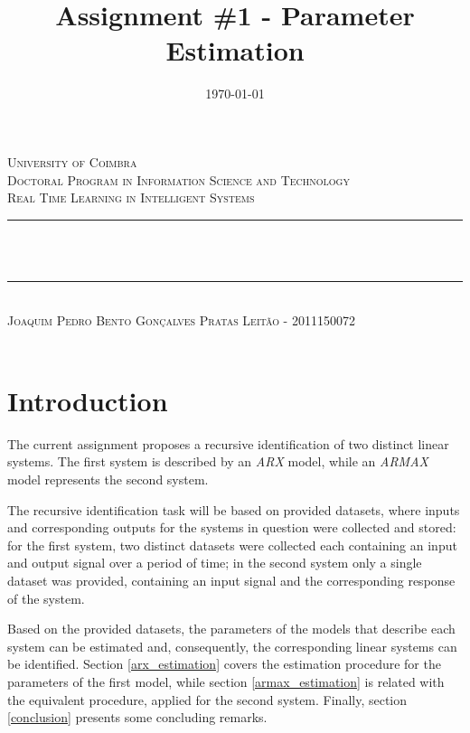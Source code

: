 \documentclass[12pt]{article}
\title{Assignment \#1 - Parameter Estimation}
\date{\today}
\makeatletter
\let\thetitle\@title
\let\thedate\@date
\makeatother
\begin{document}

\begin{titlepage}
	\centering
    \textsc{\LARGE University of Coimbra}\\[1.0 cm]
	\textsc{\large Doctoral Program in Information Science and Technology}\\[0.5 cm]
    \textsc{\large Real Time Learning in Intelligent Systems}\\[5 cm]
	\rule{\linewidth}{0.2 mm} \\[0.4 cm]
	{ \LARGE \bfseries \thetitle}\\ [0.2 cm]
    \rule{\linewidth}{0.2 mm} \\[3 cm]
    
    \textsc{Joaquim Pedro Bento Gonçalves Pratas Leitão - 2011150072}\\[5 cm]
	
	{\large \thedate}\\[2 cm]
 
	\vfill
	
\end{titlepage}


\section{Introduction}
\label{introduction}

The current assignment proposes a recursive identification of two distinct linear systems. The first system is described by an \emph{ARX} model, while an \emph{ARMAX} model represents the second system.

The recursive identification task will be based on provided datasets, where inputs and corresponding outputs for the systems in question were collected and stored: for the first system, two distinct datasets were collected each containing an input and output signal over a period of time; in the second system only a single dataset was provided, containing an input signal and the corresponding response of the system.

Based on the provided datasets, the parameters of the models that describe each system can be estimated and, consequently, the corresponding linear systems can be identified. Section \ref{arx_estimation} covers the estimation procedure for the parameters of the first model, while section \ref{armax_estimation} is related with the equivalent procedure, applied for the second system. Finally, section \ref{conclusion} presents some concluding remarks.
\end{document}
